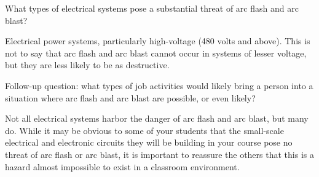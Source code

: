 

What types of electrical systems pose a substantial threat of arc flash and arc blast?







Electrical power systems, particularly high-voltage (480 volts and above).  This is not to say that arc flash and arc blast cannot occur in systems of lesser voltage, but they are less likely to be as destructive.

\vskip 10pt

Follow-up question: what types of job activities would likely bring a person into a situation where arc flash and arc blast are possible, or even likely?







Not all electrical systems harbor the danger of arc flash and arc blast, but many do.  While it may be obvious to some of your students that the small-scale electrical and electronic circuits they will be building in your course pose no threat of arc flash or arc blast, it is important to reassure the others that this is a hazard almost impossible to exist in a classroom environment.




